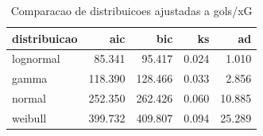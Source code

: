 \begin{table}

\caption{\label{tab:ajuste_dist_g10}Comparacao de distribuicoes ajustadas a gols/xG}
\centering
\begin{tabular}[t]{lrrrr}
\toprule
distribuicao & aic & bic & ks & ad\\
\midrule
lognormal & 85.341 & 95.417 & 0.024 & 1.010\\
gamma & 118.390 & 128.466 & 0.033 & 2.856\\
normal & 252.350 & 262.426 & 0.060 & 10.885\\
weibull & 399.732 & 409.807 & 0.094 & 25.289\\
\bottomrule
\end{tabular}
\end{table}
